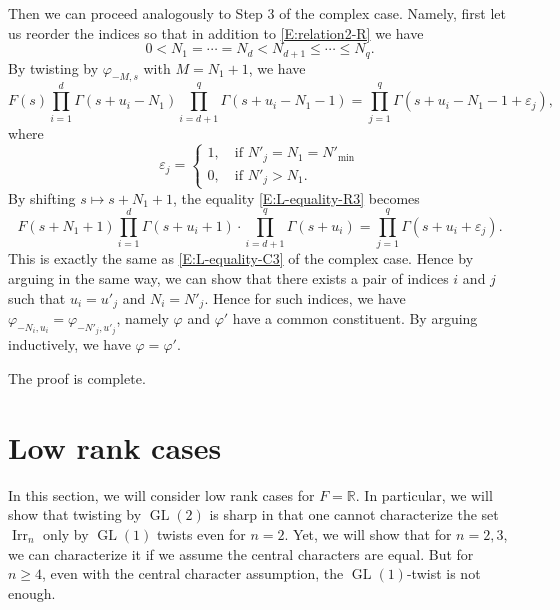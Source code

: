 \documentclass[11pt]{amsart}
\theoremstyle{plain}
\theoremstyle{definition}
\numberwithin{equation}{section}
\newcommand{\R}{\mathbb{R}}
\newcommand{\ep}{\varepsilon}
\newcommand{\Irr}{\operatorname{Irr}}
\newcommand{\GL}{\operatorname{GL}}
\begin{document}
Then we can proceed analogously to Step 3 of the complex case. Namely,
first let us reorder the indices so that in addition to
\eqref{E:relation2-R} we have
\begin{equation}\label{E:relation1-R}
0<N_1=\cdots=N_{d}<N_{d+1}\leq\cdots\leq N_q.
\end{equation}
By twisting by $\varphi_{-M,s}$ with $M=N_1+1$, we have
\begin{equation}\label{E:L-equality-R3}
F(s)\prod_{i=1}^d\Gamma(s+u_i-N_1)\prod_{i=d+1}^q\Gamma(s+u_i-N_1-1)
=\prod_{j=1}^q\Gamma(s+u_i-N_1-1+\ep_j),
\end{equation}
where
\[
\ep_j=\begin{cases}1,\quad\text{if $N'_j=N_1=N'_{\min}$}\\
0,\quad\text{if $N'_j>N_1$}.
\end{cases}
\]
By shifting $s\mapsto s+N_1+1$, the equality \eqref{E:L-equality-R3}
becomes
\begin{equation}\label{E:L-equality-R3-1}
F(s+N_1+1)\prod_{i=1}^d\Gamma(s+u_i+1)\cdot\prod_{i=d+1}^q\Gamma(s+u_i)
=\prod_{j=1}^q\Gamma(s+u_i+\ep_j).
\end{equation}
This is exactly the same as \eqref{E:L-equality-C3} of the complex
case. Hence by arguing in the same way, we can show that there exists
a pair of indices $i$ and $j$ such that $u_i=u'_j$ and
$N_i=N'_j$. Hence for such indices, we have $\varphi_{-N_i,
  u_i}=\varphi_{-N'_j, u'_j}$, namely $\varphi$ and $\varphi'$ have a
common constituent. By arguing inductively, we have
$\varphi=\varphi'$. 

The proof is complete.




\section{Low rank cases}


In this section, we will consider low rank cases for $F=\R$. In
particular, we will show that twisting by $\GL(2)$ is sharp in
that one cannot characterize the set $\Irr_n$ only by $\GL(1)$ twists
even for $n=2$. Yet, we will show that for $n=2, 3$, we can
characterize it if we  assume the central characters are equal.
But for $n\geq 4$, even with the central character
assumption, the $\GL(1)$-twist is not enough.
\end{document}
